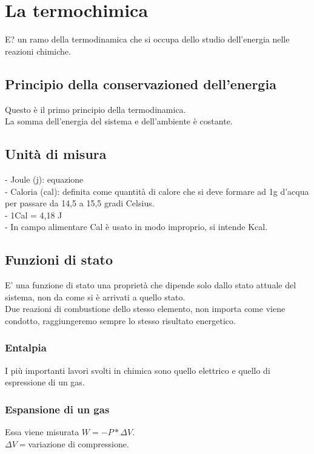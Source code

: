 \section{La termochimica}
E? un ramo della termodinamica che si occupa dello studio dell'energia nelle reazioni chimiche.
\subsection{Principio della conservazioned dell'energia}
Questo è il primo principio della termodinamica.\\
La somma dell'energia del sistema e dell'ambiente è costante.
\subsection{Unità di misura}
\tab- Joule (j): equazione\\
\tab- Caloria (cal): definita come quantità di calore che si deve formare ad 1g d'acqua per passare da 14,5 a 15,5 gradi Celsius.\\
\tab- 1Cal = 4,18 J\\
\tab- In campo alimentare Cal è usato in modo improprio, si intende Kcal.
\subsection{Funzioni di stato}
E' una funzione di stato una proprietà che dipende solo dallo stato attuale del sistema, non da come si è arrivati a quello stato.\\
Due reazioni di combustione dello stesso elemento, non importa come viene condotto, raggiungeremo sempre lo stesso risultato energetico.
\subsubsection{Entalpia}
I più importanti lavori svolti in chimica sono quello elettrico e quello di espressione di un gas.
\subsubsection{Espansione di un gas}
Essa viene misurata $W = -P * \Delta V$.\\
$\Delta V = $variazione di compressione.
